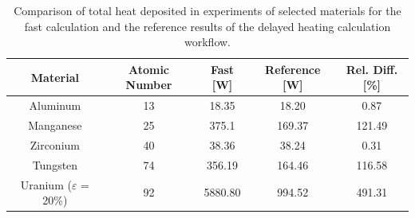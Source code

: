 \begin{table}[htbp!]
  \centering
  \caption{Comparison of total heat deposited in experiments of selected materials for the fast calculation and the reference results of the delayed heating calculation workflow.}
  \label{tab:fast-calc}
  \begin{tabular}{ccccc}
    \toprule
    Material     & Atomic Number  & Fast [W]   & Reference [W]   & Rel. Diff. [\%] \\
    \midrule
    Aluminum     & 13             & 18.35      & 18.20           & 0.87            \\
    Manganese    & 25             & 375.1      & 169.37          & 121.49          \\
    Zirconium    & 40             & 38.36      & 38.24           & 0.31            \\
    Tungsten     & 74             & 356.19     & 164.46          & 116.58          \\
    Uranium ($\varepsilon$ = 20\%) & 92  & 5880.80  & 994.52     & 491.31          \\
    \bottomrule
  \end{tabular}
\end{table}

